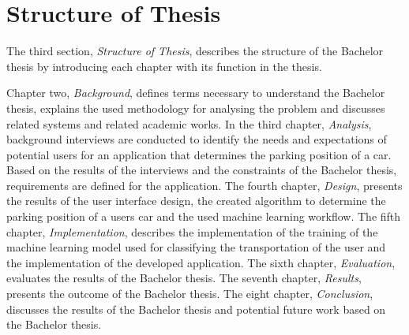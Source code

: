 \section{Structure of Thesis}
The third section, \textit{Structure of Thesis}, describes the structure of the Bachelor thesis by introducing each chapter with its function in the thesis.

Chapter two, \textit{Background}, defines terms necessary to understand the Bachelor thesis, explains the used methodology for analysing the problem and discusses related systems and related academic works.
In the third chapter, \textit{Analysis}, background interviews are conducted to identify the needs and expectations of potential users for an application that determines the parking position of a car. Based on the results of the interviews and the constraints of the Bachelor thesis, requirements are defined for the application.
The fourth chapter, \textit{Design}, presents the results of the user interface design, the created algorithm to determine the parking position of a users car and the used machine learning workflow.
The fifth chapter, \textit{Implementation}, describes the implementation of the training of the machine learning model used for classifying the transportation of the user and the implementation of the developed application. 
The sixth chapter, \textit{Evaluation}, evaluates the results of the Bachelor thesis.
The seventh chapter, \textit{Results}, presents the outcome of the Bachelor thesis.
The eight chapter, \textit{Conclusion}, discusses the results of the Bachelor thesis and potential future work based on the Bachelor thesis.